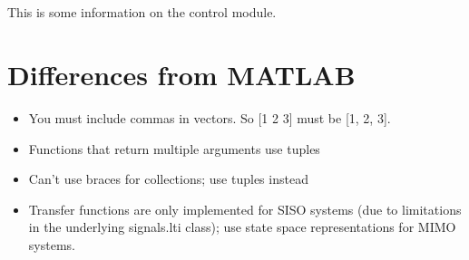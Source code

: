 \documentclass{manual}
\begin{document}

\section{}
This is some information on the control module.

\section{Differences from MATLAB}
\begin{itemize}
  \item You must include commas in vectors.  So [1 2 3] must be [1, 2, 3].
  \item Functions that return multiple arguments use tuples
  \item Can't use braces for collections; use tuples instead
  \item Transfer functions are only implemented for SISO systems (due
  to limitations in the underlying signals.lti class); use state space
  representations for MIMO systems.
\end{itemize}
\end{document}
